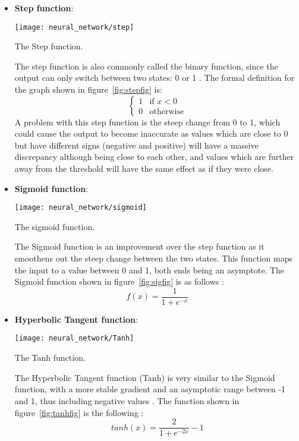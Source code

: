 \begin{itemize}
	
	\item\textbf{Step function}:
	\begin{marginfigure}%
		\texttt{[image: neural\_network/step]}
		\caption{The Step function.}
		\label{fig:stepfig}
	\end{marginfigure}
	The step function is also commonly called the binary function, since the output can only switch between two states: 0 or 1 \cite{sharmav_2017}. The formal definition for the graph shown in figure~\ref{fig:stepfig} is: 
	\begin{equation}
	\begin{cases}
	1 & \text{if $x < 0 $} \\
	0 & \text{otherwise}
	\end{cases}
	\end{equation} 
	A problem with this step function is the steep change from 0 to 1, which could cause the output to become inaccurate as values which are close to 0 but have different signs (negative and positive) will have a massive discrepancy although being close to each other, and values which are further away from the threshold will have the same effect as if they were close.
	
	\item\textbf{Sigmoid function}:
	\begin{marginfigure}%
		\texttt{[image: neural\_network/sigmoid]}
		\caption{The sigmoid function.}
		\label{fig:sigfig}
	\end{marginfigure} The Sigmoid function is an improvement over the step function as it smoothens out the steep change between the two states. This function maps the input to a value between 0 and 1, both ends being an asymptote. The Sigmoid function shown in figure~\ref{fig:sigfig} is as follows \cite{Haykin:1994:NNC:541500, sharmav_2017}: $$f(x) = \frac{1}{1+e^{-x}}$$
	
	\item\textbf{Hyperbolic Tangent function}:
	\begin{marginfigure}%
		\texttt{[image: neural\_network/Tanh]}
		\caption{The Tanh function.}
		\label{fig:tanhfig}
	\end{marginfigure}
	The Hyperbolic Tangent function (Tanh) is very similar to the Sigmoid function, with a more stable gradient and an asymptotic range between -1 and 1, thus including negative values \cite{Haykin:1994:NNC:541500,sharmav_2017}. The function shown in figure~\ref{fig:tanhfig} is the following \cite{sharmav_2017}: $$tanh(x) = \frac{2}{1+e^{-2x}}-1 $$
	
\end{itemize}
